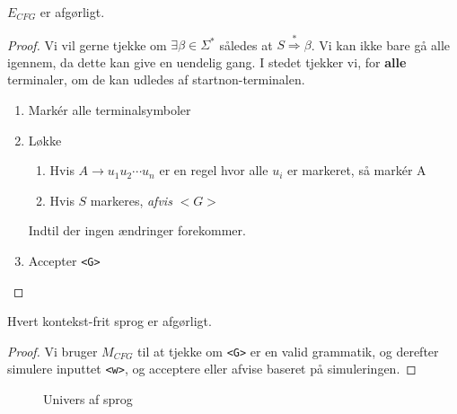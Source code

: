 \begin{theorem}
	$E_{CFG}$ er afgørligt.
\end{theorem}

\begin{proof}
	Vi vil gerne tjekke om $\exists \beta \in \Sigma^{*}$ således at $S \stackrel{*}{\Rightarrow} \beta$. Vi kan ikke bare gå alle igennem, da dette kan give en uendelig gang. I stedet tjekker vi, for \textbf{alle} terminaler, om de kan udledes af startnon-terminalen.
	\begin{enumerate}
		\item Markér alle terminalsymboler
		\item Løkke
		      \begin{enumerate}
			      \item Hvis $A \rightarrow u_{1}u_{2} \cdots u_{n}$ er en regel hvor alle $u_i$ er markeret, så markér A
			      \item Hvis $S$ markeres, \textit{afvis} $<G>$
		      \end{enumerate}
		      Indtil der ingen ændringer forekommer.

		\item Accepter \texttt{<G>}
	\end{enumerate}
\end{proof}

\begin{theorem}
	Hvert kontekst-frit sprog er afgørligt.
\end{theorem}

\begin{proof}
	Vi bruger $M_{CFG}$ til at tjekke om \texttt{<G>} er en valid grammatik, og derefter simulere inputtet \texttt{<w>}, og acceptere eller afvise baseret på simuleringen.
\end{proof}

\begin{figure}[ht]
	\centering
	\caption{\label{fig:univers2} Univers af sprog}
\end{figure}

